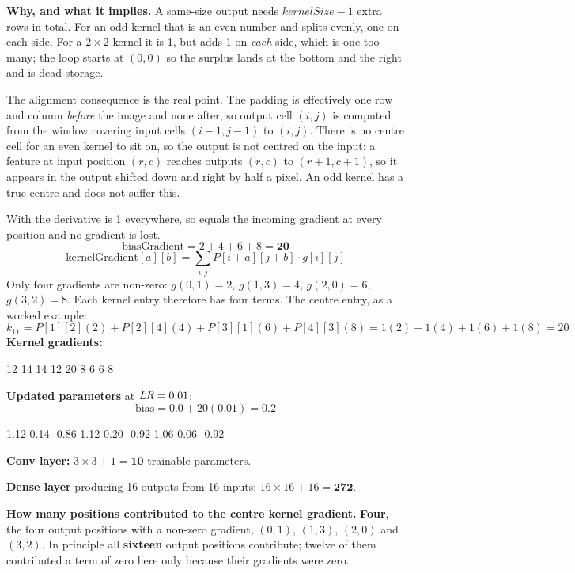 \textbf{Why, and what it implies.} A same-size output needs $\mathit{kernelSize} - 1$ extra rows in
total. For an odd kernel that is an even number and splits evenly, one on each side. For a
$2 \times 2$ kernel it is 1, but  adds 1 on \emph{each} side, which is
one too many; the loop starts at $(0,0)$ so the surplus lands at the bottom and the right and is
dead storage.

The alignment consequence is the real point. The padding is effectively one row and column
\emph{before} the image and none after, so output cell $(i,j)$ is computed from the window covering
input cells $(i-1, j-1)$ to $(i, j)$. There is no centre cell for an even kernel to sit on, so the
output is not centred on the input: a feature at input position $(r, c)$ reaches outputs $(r, c)$
to $(r+1, c+1)$, so it appears in the output shifted down and right by half a pixel. An odd kernel
has a true centre and does not suffer this. 

With  the derivative is 1 everywhere, so  equals the incoming
gradient at every position and no gradient is lost.
\[
  \text{biasGradient} = 2 + 4 + 6 + 8 = \mathbf{20}
\]
\[
  \text{kernelGradient}[a][b] = \sum_{i,j} P[i+a][j+b] \cdot g[i][j]
\]
Only four gradients are non-zero: $g(0,1) = 2$, $g(1,3) = 4$, $g(2,0) = 6$, $g(3,2) = 8$. Each
kernel entry therefore has four terms. The centre entry, as a worked example:
\[
  k_{11} = P[1][2](2) + P[2][4](4) + P[3][1](6) + P[4][3](8) = 1(2) + 1(4) + 1(6) + 1(8) = 20
\]
\textbf{Kernel gradients:}

\begin{console}
12   14   14
12   20    8
 6    6    8
\end{console}

\textbf{Updated parameters} at $\mathit{LR} = 0.01$:
\[
  \text{bias} = 0.0 + 20(0.01) = \mathbf{0.2}
\]

\begin{console}
1.12   0.14  -0.86
1.12   0.20  -0.92
1.06   0.06  -0.92
\end{console}

\textbf{Conv layer:} $3 \times 3 + 1 = \mathbf{10}$ trainable parameters.

\textbf{Dense layer} producing 16 outputs from 16 inputs: $16 \times 16 + 16 = \mathbf{272}$.

\textbf{How many positions contributed to the centre kernel gradient.} \textbf{Four}, the four
output positions with a non-zero gradient, $(0,1)$, $(1,3)$, $(2,0)$ and $(3,2)$. In principle all
\textbf{sixteen} output positions contribute; twelve of them contributed a term of zero here only
because their gradients were zero. 

